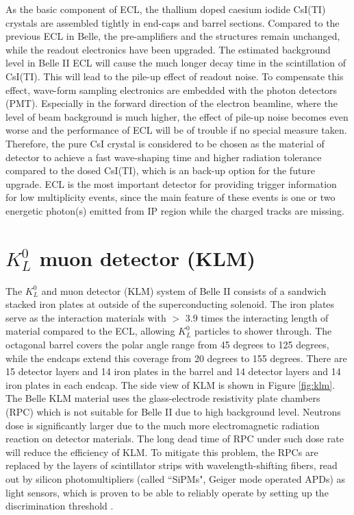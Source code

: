  As the basic component of ECL, the  thallium doped caesium iodide CsI(TI) crystals are assembled tightly in end-caps and barrel sections. Compared to the previous ECL in Belle, the pre-amplifiers and the structures remain unchanged, while the readout  electronics have been upgraded. The estimated background level in Belle II ECL will cause the much longer decay time in the scintillation of CsI(TI). This will lead to the pile-up effect of readout noise. To compensate this effect, wave-form sampling electronics are embedded with the photon detectors (PMT). Especially in the forward direction of the electron beamline, where the level of beam background is much higher, the effect of pile-up noise becomes even worse and the performance of ECL will be of trouble if no special measure taken. Therefore, the pure CsI crystal is considered to be chosen as the material of detector to achieve a fast wave-shaping time and higher radiation tolerance compared to the dosed CsI(TI), which is an back-up option for the future upgrade. ECL is the most important detector for providing trigger information for low multiplicity events, since the main feature of these events is one or two energetic photon(s) emitted from IP region while the charged tracks are missing. 

\section{$K_L^0$ muon detector (KLM)}
The $K_L^0$ and muon detector (KLM) system of Belle II consists of a sandwich stacked iron plates at outside of the superconducting solenoid. The iron plates serve as the interaction materials with $>$ 3.9 times the interacting length of material compared to the ECL, allowing $K_L^0$ particles to shower through. The octagonal barrel covers the polar angle range from 45 degrees to 125 degrees, while the endcaps extend
this coverage from 20 degrees to 155 degrees. There are 15 detector layers and 14 iron plates in the barrel and
14 detector layers and 14 iron plates in each endcap. The side view of KLM is shown in Figure \ref{fig:klm}.
The Belle KLM material uses the glass-electrode resistivity plate chambers (RPC) which is not suitable for Belle II due to high background level.  Neutrons dose is significantly larger due to the much more electromagnetic radiation reaction on detector materials. The long dead time of RPC under such dose rate will reduce the efficiency of KLM. To mitigate this problem, the RPCs are replaced by the layers of scintillator strips with wavelength-shifting ﬁbers, read out by silicon photomultipliers (called ``SiPMs", Geiger mode operated APDs) as light sensors, which is proven to be able to reliably operate by setting up the discrimination threshold \cite{b2book}.

